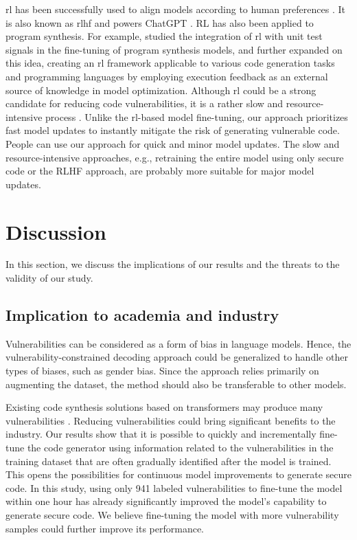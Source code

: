 \documentclass[12pt]{book}
\begin{document}
\Acrfull{rl} has been successfully used to align models according to human preferences \cite{ouyang2022training}. It is also known as \acrfull{rlhf} and powers ChatGPT \cite{chatgpt}. RL has also been applied to program synthesis. For example, \cite{le2022coderl} studied the integration of \acrshort{rl} with unit test signals in the fine-tuning of program synthesis models, and \cite{shojaee2023executionbased} further expanded on this idea, creating an \acrshort{rl} framework applicable to various code generation tasks and programming languages by employing execution feedback as an external source of knowledge in model optimization. Although \acrshort{rl} could be a strong candidate for reducing code vulnerabilities, it is a rather slow and resource-intensive process \cite{janner2021offline}. Unlike the \acrshort{rl}-based model fine-tuning, our approach prioritizes fast model updates to instantly mitigate the risk of generating vulnerable code. People can use our approach for quick and minor model updates. The slow and resource-intensive approaches, e.g., retraining the entire model using only secure code or the RLHF approach, are probably more suitable for major model updates.


\section{Discussion}
\label{chap:discussion}

In this section, we discuss the implications of our results and the threats to the validity of our study.

\subsection{Implication to academia and industry}
\label{sec:rq1-implication-to-academia-and-industry}

Vulnerabilities can be considered as a form of bias in language models. Hence, the vulnerability-constrained decoding approach could be generalized to handle other types of biases, such as gender bias. Since the approach relies primarily on augmenting the dataset, the method should also be transferable to other models. 

Existing code synthesis solutions based on transformers may produce many vulnerabilities \citet{pearch2021asleep}. Reducing vulnerabilities could bring significant benefits to the industry. Our results show that it is possible to quickly and incrementally fine-tune the code generator using information related to the vulnerabilities in the training dataset that are often gradually identified after the model is trained. This opens the possibilities for continuous model improvements to generate secure code. In this study, using only 941 labeled vulnerabilities to fine-tune the model within one hour has already significantly improved the model's capability to generate secure code. We believe fine-tuning the model with more vulnerability samples could further improve its performance.
\end{document}
